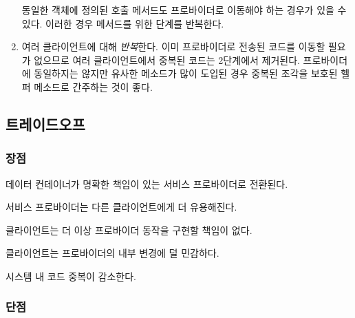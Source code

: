 \documentclass[a4paper,10pt,twoside]{book}
\begin{document}
\begin{enumerate}

동일한 객체에 정의된 호출 메서드도 프로바이더로 이동해야 하는 경우가 있을 수 있다. 이러한 경우 메서드를 위한 단계를 반복한다.

\item 여러 클라이언트에 대해 \emph{반복}한다. 이미 프로바이더로 전송된 코드를 이동할 필요가 없으므로 여러 클라이언트에서 중복된 코드는 2단계에서 제거된다. 프로바이더에 동일하지는 않지만 유사한 메소드가 많이 도입된 경우 중복된 조각을 보호된 헬퍼 메소드로 간주하는 것이 좋다.

\end{enumerate}

\subsection*{트레이드오프}

\subsubsection*{장점}

\begin{bulletlist}
\item 데이터 컨테이너가 명확한 책임이 있는 서비스 프로바이더로 전환된다.

\item 서비스 프로바이더는 다른 클라이언트에게 더 유용해진다.

\item 클라이언트는 더 이상 프로바이더 동작을 구현할 책임이 없다.

\item 클라이언트는 프로바이더의 내부 변경에 덜 민감하다. 

\item 시스템 내 코드 중복이 감소한다.
\end{bulletlist}

\subsubsection*{단점}
\end{document}
